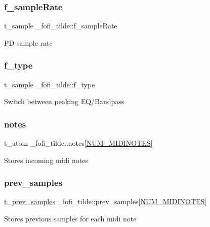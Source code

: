 \subsubsection{\texorpdfstring{f\_sampleRate}{f\_sampleRate}}
{\footnotesize\ttfamily t\+\_\+sample \+\_\+fofi\+\_\+tilde\+::f\+\_\+sample\+Rate}

PD sample rate \mbox{\label{struct__fofi__tilde_a1f826f040d78942f1cb95b2c903bd36d}} 
\subsubsection{\texorpdfstring{f\_type}{f\_type}}
{\footnotesize\ttfamily t\+\_\+sample \+\_\+fofi\+\_\+tilde\+::f\+\_\+type}

Switch between peaking E\+Q/\+Bandpass \mbox{\label{struct__fofi__tilde_a19888916f4cb842a3df03aaaacae812e}} 
\subsubsection{\texorpdfstring{notes}{notes}}
{\footnotesize\ttfamily t\+\_\+atom \+\_\+fofi\+\_\+tilde\+::notes\mbox{[}\mbox{\hyperlink{fofi~_8h_ae3ab4a4583b2509064f2fbafe7a1f8b0}{N\+U\+M\+\_\+\+M\+I\+D\+I\+N\+O\+T\+ES}}\mbox{]}}

Stores incoming midi notes \mbox{\label{struct__fofi__tilde_a20d97ab99b35909dcf2a51b292c39a33}} 
\subsubsection{\texorpdfstring{prev\_samples}{prev\_samples}}
{\footnotesize\ttfamily \mbox{\hyperlink{fofi~_8h_a728138bbe23514a1927f1f686090cd52}{t\+\_\+prev\+\_\+samples}} \+\_\+fofi\+\_\+tilde\+::prev\+\_\+samples\mbox{[}\mbox{\hyperlink{fofi~_8h_ae3ab4a4583b2509064f2fbafe7a1f8b0}{N\+U\+M\+\_\+\+M\+I\+D\+I\+N\+O\+T\+ES}}\mbox{]}}

Stores previous samples for each midi note \mbox{\label{struct__fofi__tilde_a97f9021a0fee597ec4a100473f7aafd3}} 
